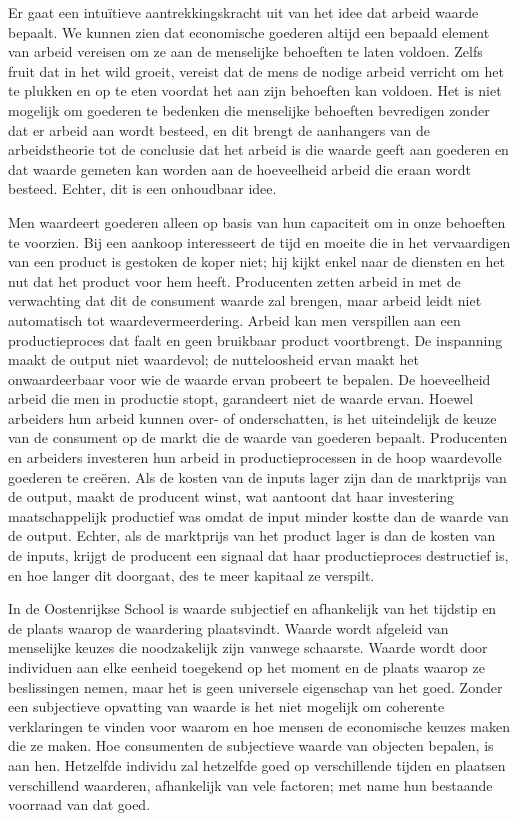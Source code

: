 \documentclass[
  a5paper,
  smalldemyvopaper,11pt,twoside,onecolumn,openright,extrafontsizes,
hidelinks]{memoir}
\begin{document}
Er gaat een intuïtieve aantrekkingskracht uit van het idee dat arbeid
waarde bepaalt. We kunnen zien dat economische goederen altijd een
bepaald element van arbeid vereisen om ze aan de menselijke behoeften te
laten voldoen. Zelfs fruit dat in het wild groeit, vereist dat de mens
de nodige arbeid verricht om het te plukken en op te eten voordat het
aan zijn behoeften kan voldoen. Het is niet mogelijk om goederen te
bedenken die menselijke behoeften bevredigen zonder dat er arbeid aan
wordt besteed, en dit brengt de aanhangers van de arbeidstheorie tot de
conclusie dat het arbeid is die waarde geeft aan goederen en dat waarde
gemeten kan worden aan de hoeveelheid arbeid die eraan wordt besteed.
Echter, dit is een onhoudbaar idee.

Men waardeert goederen alleen op basis van hun capaciteit om in onze
behoeften te voorzien. Bij een aankoop interesseert de tijd en moeite
die in het vervaardigen van een product is gestoken de koper niet; hij
kijkt enkel naar de diensten en het nut dat het product voor hem heeft.
Producenten zetten arbeid in met de verwachting dat dit de consument
waarde zal brengen, maar arbeid leidt niet automatisch tot
waardevermeerdering. Arbeid kan men verspillen aan een productieproces
dat faalt en geen bruikbaar product voortbrengt. De inspanning maakt de
output niet waardevol; de nutteloosheid ervan maakt het onwaardeerbaar
voor wie de waarde ervan probeert te bepalen. De hoeveelheid arbeid die
men in productie stopt, garandeert niet de waarde ervan. Hoewel
arbeiders hun arbeid kunnen over- of onderschatten, is het uiteindelijk
de keuze van de consument op de markt die de waarde van goederen
bepaalt. Producenten en arbeiders investeren hun arbeid in
productieprocessen in de hoop waardevolle goederen te creëren. Als de
kosten van de inputs lager zijn dan de marktprijs van de output, maakt
de producent winst, wat aantoont dat haar investering maatschappelijk
productief was omdat de input minder kostte dan de waarde van de output.
Echter, als de marktprijs van het product lager is dan de kosten van de
inputs, krijgt de producent een signaal dat haar productieproces
destructief is, en hoe langer dit doorgaat, des te meer kapitaal ze
verspilt.

In de Oostenrijkse School is waarde subjectief en afhankelijk van het
tijdstip en de plaats waarop de waardering plaatsvindt. Waarde wordt
afgeleid van menselijke keuzes die noodzakelijk zijn vanwege schaarste.
Waarde wordt door individuen aan elke eenheid toegekend op het moment en
de plaats waarop ze beslissingen nemen, maar het is geen universele
eigenschap van het goed. Zonder een subjectieve opvatting van waarde is
het niet mogelijk om coherente verklaringen te vinden voor waarom en hoe
mensen de economische keuzes maken die ze maken. Hoe consumenten de
subjectieve waarde van objecten bepalen, is aan hen. Hetzelfde individu
zal hetzelfde goed op verschillende tijden en plaatsen verschillend
waarderen, afhankelijk van vele factoren; met name hun bestaande
voorraad van dat goed.
\end{document}
